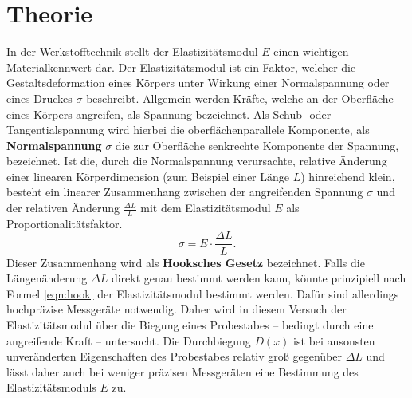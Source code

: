 \section{Theorie}
\label{sec:Theorie}

In der Werkstofftechnik stellt der Elastizitätsmodul $E$ einen wichtigen Materialkennwert dar.
Der Elastizitätsmodul ist ein Faktor, welcher die Gestaltsdeformation eines Körpers unter Wirkung einer Normalspannung oder eines Druckes $\sigma$ beschreibt.
Allgemein werden Kräfte, welche an der Oberfläche eines Körpers angreifen, als Spannung bezeichnet. Als Schub- oder Tangentialspannung wird hierbei die oberflächenparallele Komponente, als \textbf{Normalspannung} $\sigma$ die zur Oberfläche senkrechte Komponente der Spannung, bezeichnet.
Ist die, durch die Normalspannung verursachte, relative Änderung einer linearen Körperdimension (zum Beispiel einer Länge $L$) hinreichend klein,
besteht ein linearer Zusammenhang zwischen der angreifenden Spannung $\sigma$ und der relativen Änderung $\frac{\Delta L}{L}$ mit dem Elastizitätsmodul $E$ als Proportionalitätsfaktor.
\begin{equation}
	\label{eqn:hook}
	\sigma=E \cdot \frac{\Delta L}{L} \mathrm{.}
\end{equation}
Dieser Zusammenhang wird als \textbf{Hooksches Gesetz} bezeichnet.
Falls die Längenänderung $\Delta L$ direkt genau bestimmt werden kann, könnte prinzipiell nach Formel \eqref{eqn:hook} der Elastizitätsmodul bestimmt werden.
Dafür sind allerdings hochpräzise Messgeräte notwendig. Daher wird in diesem Versuch der Elastizitätsmodul über die Biegung eines Probestabes -- bedingt durch eine angreifende Kraft -- untersucht.
Die Durchbiegung $D(x)$ ist bei ansonsten unveränderten Eigenschaften des Probestabes relativ groß gegenüber $\Delta L$ und lässt daher auch bei weniger präzisen Messgeräten eine Bestimmung des Elastizitätsmoduls $E$ zu.

